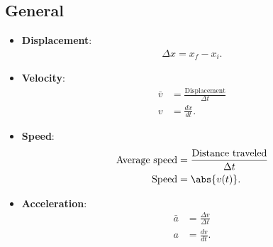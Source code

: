 \documentclass{report}
\begin{document}
\begin{itemize}
    \end{itemize}

    \pagebreak 
    \bigbreak \noindent 
    \subsection{General}
    \begin{itemize}
        \item \textbf{Displacement}:
            \begin{align*}
                \Delta x = x_{f} - x_{i} 
            .\end{align*}
        \item \textbf{Velocity}:
            \begin{align*}
                \bar{v} &= \frac{\text{Displacement}}{\Delta t} \\
                v &= \frac{dx}{dt}
            .\end{align*}
        \item \textbf{Speed}:
            \begin{align*}
                \text{Average speed} &= \frac{\text{Distance traveled}}{\Delta t} \\
                \text{Speed} &= \abs{v(t)}
            .\end{align*}
        \item \textbf{Acceleration}:
            \begin{align*}
                \bar{a} &= \frac{\Delta v}{\Delta t}  \\
                a &= \frac{dv}{dt}
            .\end{align*}
    \end{itemize}
    \pagebreak 
\end{document}
